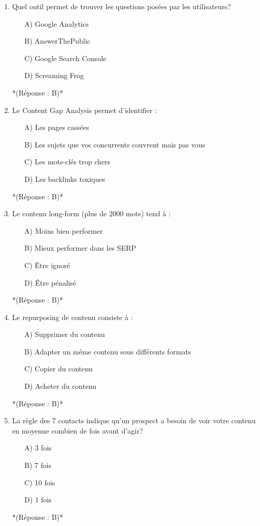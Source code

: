 \documentclass[12pt,a4paper,twoside]{report}
\begin{document}
\begin{enumerate}
\item Quel outil permet de trouver les questions posées par les utilisateurs?
\begin{itemize}
\item[A)] Google Analytics
\item[B)] AnswerThePublic
\item[C)] Google Search Console
\item[D)] Screaming Frog
\end{itemize}
*(Réponse : B)*

\item Le Content Gap Analysis permet d'identifier :
\begin{itemize}
\item[A)] Les pages cassées
\item[B)] Les sujets que vos concurrents couvrent mais pas vous
\item[C)] Les mots-clés trop chers
\item[D)] Les backlinks toxiques
\end{itemize}
*(Réponse : B)*

\item Le contenu long-form (plus de 2000 mots) tend à :
\begin{itemize}
\item[A)] Moins bien performer
\item[B)] Mieux performer dans les SERP
\item[C)] Être ignoré
\item[D)] Être pénalisé
\end{itemize}
*(Réponse : B)*

\item Le repurposing de contenu consiste à :
\begin{itemize}
\item[A)] Supprimer du contenu
\item[B)] Adapter un même contenu sous différents formats
\item[C)] Copier du contenu
\item[D)] Acheter du contenu
\end{itemize}
*(Réponse : B)*

\item La règle des 7 contacts indique qu'un prospect a besoin de voir votre contenu en moyenne combien de fois avant d'agir?
\begin{itemize}
\item[A)] 3 fois
\item[B)] 7 fois
\item[C)] 10 fois
\item[D)] 1 fois
\end{itemize}
*(Réponse : B)*


\end{enumerate}
\end{document}

